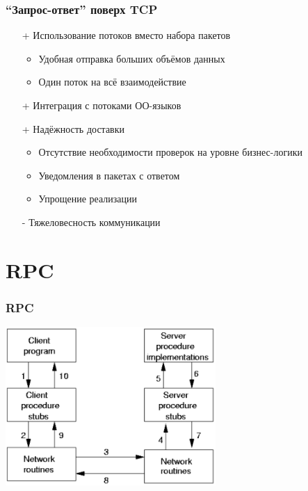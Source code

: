 \documentclass[xetex,mathserif,serif]{beamer}
\begin{document}
	\begin{frame}
		\frametitle{``Запрос-ответ'' поверх TCP}
		\begin{itemize}
			\item[+] Использование потоков вместо набора пакетов
			\begin{itemize}
				\item Удобная отправка больших объёмов данных
				\item Один поток на всё взаимодействие
			\end{itemize}
			\item[+] Интеграция с потоками ОО-языков
			\item[+] Надёжность доставки
			\begin{itemize}
				\item Отсутствие необходимости проверок на уровне бизнес-логики
				\item Уведомления в пакетах с ответом
				\item Упрощение реализации
			\end{itemize}
			\item[-] Тяжеловесность коммуникации
		\end{itemize}
	\end{frame}

	\section{RPC}

	\begin{frame}
		\frametitle{RPC}
		\begin{center}
			\includegraphics[width=0.6\textwidth]{rpc.png}
		\end{center}
	\end{frame}
\end{document}

